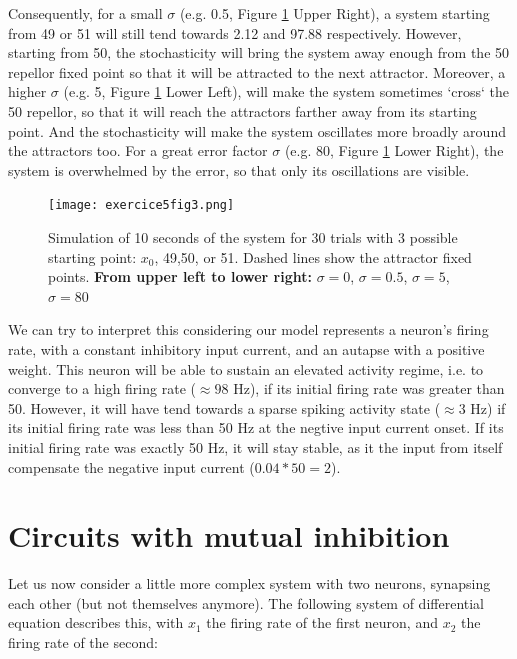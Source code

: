 \documentclass{article}
\begin{document}
Consequently, for a small $\sigma$ (e.g. 0.5, Figure \ref{fig:fig3} Upper Right), a system starting from 49 or 51 will still tend towards 2.12 and 97.88 respectively. However, starting from 50, the stochasticity will bring the system away enough from the 50 repellor fixed point so that it will be attracted to the next attractor. Moreover, a higher $\sigma$ (e.g. 5, Figure \ref{fig:fig3} Lower Left), will make the system sometimes `cross` the 50 repellor, so that it will reach the attractors farther away from its starting point. And the stochasticity will make the system oscillates more broadly around the attractors too. For a great error factor $\sigma$ (e.g. 80, Figure \ref{fig:fig3} Lower Right), the system is overwhelmed by the error, so that only its oscillations are visible.

\begin{figure}[H]
\centering
\texttt{[image: exercice5fig3.png]}
\caption[spt]{Simulation of 10 seconds of the system for 30 trials with 3 possible starting point: $x_0$, 49,50, or 51. Dashed lines show the attractor fixed points. \textbf{From upper left to lower right:} $\sigma = 0$, $\sigma = 0.5$, $\sigma = 5$, $\sigma = 80$}\label{fig:fig3}
\end{figure}

We can try to interpret this considering our model represents a neuron's firing rate, with a constant inhibitory input current, and an autapse with a positive weight. This neuron will be able to sustain an elevated activity regime, i.e. to converge to a high firing rate ($\approx 98$ Hz), if its initial firing rate was greater than 50. However, it will have tend towards a sparse spiking activity state ($\approx 3$ Hz) if its initial firing rate was less than 50 Hz at the negtive input current onset. If its initial firing rate was exactly 50 Hz, it will stay stable, as it the input from itself compensate the negative input current ($0.04*50=2$).


\section{Circuits with mutual inhibition}\label{circuits}
\indent\indent Let us now consider a little more complex system with two neurons, synapsing each other (but not themselves anymore). The following system of differential equation describes this, with $x_1$ the firing rate of the first neuron, and $x_2$ the firing rate of the second:
\end{document}
